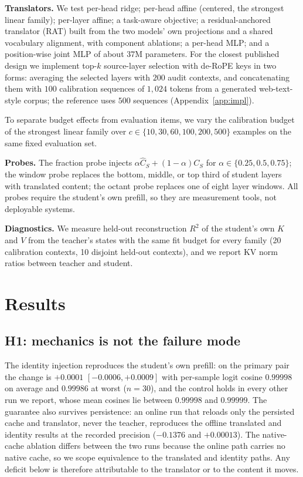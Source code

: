 \documentclass{article} %
\newcommand{\kv}{\ensuremath{\mathrm{KV}}}
\begin{document}
\textbf{Translators.} We test per-head ridge; per-head affine (centered, the
strongest linear family); per-layer affine; a task-aware objective; a
residual-anchored translator (RAT) built from the two
models' own projections and a shared vocabulary alignment, with component
ablations; a per-head MLP; and a position-wise joint MLP of about $37$M
parameters. For the closest published design we implement top-$k$ source-layer
selection with de-RoPE keys \citep{heo2026} in two forms: averaging the selected
layers with $200$ audit contexts, and concatenating them with $100$ calibration
sequences of $1{,}024$ tokens from a generated web-text-style corpus; the
reference uses $500$ sequences (Appendix~\ref{app:impl}).

To separate budget effects from evaluation items, we vary the calibration budget
of the strongest linear family over $c\in\{10,30,60,100,200,500\}$ examples on
the same fixed evaluation set.

\textbf{Probes.} The fraction probe injects
$\alpha\widehat C_S+(1-\alpha)C_S$ for $\alpha\in\{0.25,0.5,0.75\}$; the window
probe replaces the bottom, middle, or top third of student layers with
translated content; the octant probe replaces one of eight layer windows. All
probes require the student's own prefill, so they are measurement tools,
not deployable systems.

\textbf{Diagnostics.} We measure held-out reconstruction $R^2$ of the student's
own $K$ and $V$ from the teacher's states with the same fit budget for every
family (20 calibration contexts, 10 disjoint held-out contexts), and we report
\kv{} norm ratios between teacher and student.


\section{Results}
\label{sec:results}

\subsection{H1: mechanics is not the failure mode}
\label{sec:h1}
The identity injection reproduces the student's own prefill: on the primary pair
the change is $+0.0001$ $[-0.0006,+0.0009]$ with per-sample logit cosine $0.99998$
on average and $0.99986$ at worst ($n{=}30$), and the control holds in every
other run we report, whose mean cosines lie between $0.99998$ and $0.99999$.
The guarantee also survives persistence: an online run that
reloads only the persisted cache and translator, never the teacher, reproduces the
offline translated and identity results at the recorded precision ($-0.1376$ and
$+0.00013$). The native-cache ablation differs between the two runs because the
online path carries no native cache, so we scope equivalence to the translated
and identity paths. Any deficit below is therefore attributable to the translator or to
the content it moves.
\end{document}
